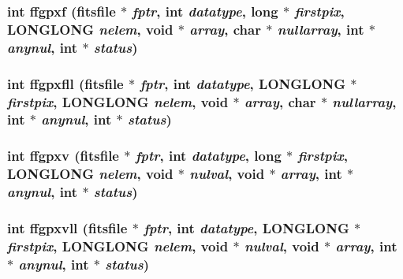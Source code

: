 \subsubsection{\setlength{\rightskip}{0pt plus 5cm}int ffgpxf (\bf{fitsfile} $\ast$ {\em fptr}, int {\em datatype}, long $\ast$ {\em firstpix}, \bf{LONGLONG} {\em nelem}, void $\ast$ {\em array}, char $\ast$ {\em nullarray}, int $\ast$ {\em anynul}, int $\ast$ {\em status})}\label{test_2shm__client_2fitsio_8h_64917e68aaefb305612dd26f21565443}


\subsubsection{\setlength{\rightskip}{0pt plus 5cm}int ffgpxfll (\bf{fitsfile} $\ast$ {\em fptr}, int {\em datatype}, \bf{LONGLONG} $\ast$ {\em firstpix}, \bf{LONGLONG} {\em nelem}, void $\ast$ {\em array}, char $\ast$ {\em nullarray}, int $\ast$ {\em anynul}, int $\ast$ {\em status})}\label{test_2shm__client_2fitsio_8h_1695916e97fed43202efca40fd7fd573}


\subsubsection{\setlength{\rightskip}{0pt plus 5cm}int ffgpxv (\bf{fitsfile} $\ast$ {\em fptr}, int {\em datatype}, long $\ast$ {\em firstpix}, \bf{LONGLONG} {\em nelem}, void $\ast$ {\em nulval}, void $\ast$ {\em array}, int $\ast$ {\em anynul}, int $\ast$ {\em status})}\label{test_2shm__client_2fitsio_8h_bfb2e7a0bf12f295d4907aed0247d9e9}


\subsubsection{\setlength{\rightskip}{0pt plus 5cm}int ffgpxvll (\bf{fitsfile} $\ast$ {\em fptr}, int {\em datatype}, \bf{LONGLONG} $\ast$ {\em firstpix}, \bf{LONGLONG} {\em nelem}, void $\ast$ {\em nulval}, void $\ast$ {\em array}, int $\ast$ {\em anynul}, int $\ast$ {\em status})}\label{test_2shm__client_2fitsio_8h_f79f3c5db73c9029a9adde6aaa91688f}


